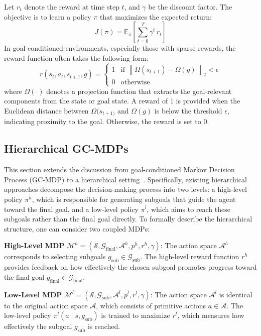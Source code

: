 \documentclass{article}
\begin{document}
Let \(r_t\) denote the reward at time step \(t\), and \(\gamma\) be the discount factor. The objective is to learn a policy \(\pi\) that maximizes the expected return:
\begin{equation}
J(\pi) = 
\mathbb{E}_{\pi} \left[ \sum_{t=0}^T \gamma^t \, r_t \right]
\end{equation}
In goal-conditioned environments, especially those with sparse rewards, the reward function often takes the following form:
\begin{equation}
r(s_t, a_t, s_{t+1}, g) =
\begin{cases}
1 & \text{if } \left\| \Omega(s_{t+1}) - \Omega(g) \right\|_2 < \epsilon \\
0 & \text{otherwise}
\end{cases}
\end{equation}
where \(\Omega(\cdot)\) denotes a projection function that extracts the goal-relevant components from the state or goal state. A reward of 1 is provided when the Euclidean distance between \(\Omega(s_{t+1)}\) and \(\Omega(g)\) is below the threshold \(\epsilon\), indicating proximity to the goal. Otherwise, the reward is set to 0.

\subsection{Hierarchical GC-MDPs}
This section extends the discussion from goal-conditioned Markov Decision Process (GC-MDP) to a hierarchical setting~\cite{kaelbling1993learning, sutton1999between, barto2003recent}. Specifically, existing hierarchical approaches decompose the decision-making process into two levels: a high-level policy $\pi^h$, which is responsible for generating subgoals that guide the agent toward the final goal, and a low-level policy $\pi^l$, which aims to reach these subgoals rather than the final goal directly. To formally describe the hierarchical structure, one can consider two coupled MDPs:

\textbf{High-Level MDP} 
$\mathcal{M}^h = (\mathcal{S}, \mathcal{G}_\text{final}, \mathcal{A}^h, p^h, r^h, \gamma)$: The action space $\mathcal{A}^h$ corresponds to selecting subgoals $g_\text{sub} \in \mathcal{G}_{\text{sub}}$. The high-level reward function $r^h$ provides feedback on how effectively the chosen subgoal promotes progress toward the final goal $g_\text{final} \in \mathcal{G}_\text{final}$.

\textbf{Low-Level MDP} 
$\mathcal{M}^l = (\mathcal{S}, \mathcal{G}_{\text{sub}}, \mathcal{A}^l, p^l, r^l, \gamma)$: The action space \(\mathcal{A}^l\) is identical to the original action space \(\mathcal{A}\), which consists of primitive actions \(a \in \mathcal{A}\). The low-level policy $\pi^l(a \mid s, g_\text{sub})$ is trained to maximize $r^l$, which measures how effectively the subgoal $g_\text{sub}$ is reached.
\end{document}
